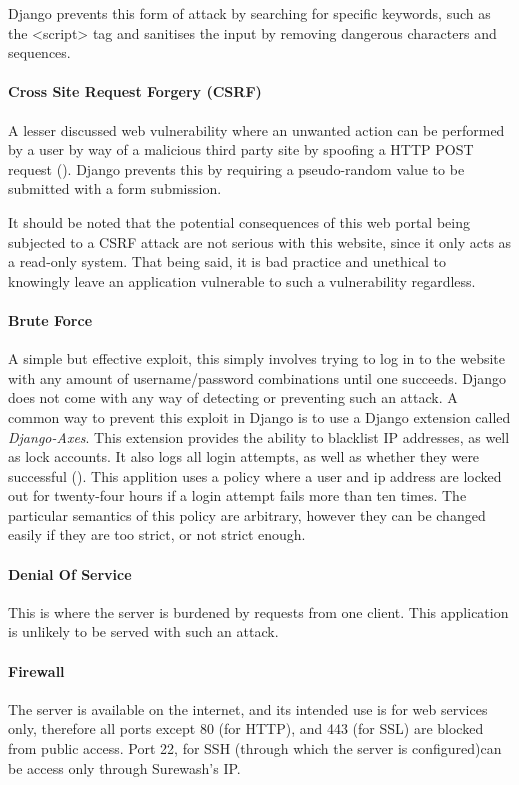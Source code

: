         Django prevents this form of attack by searching for specific keywords, such as the <script> tag and sanitises the input by removing dangerous characters and sequences.

        \paragraph{Cross Site Request Forgery (CSRF)}
        A lesser discussed web vulnerability where an unwanted action can be performed by a user by way of a malicious third party site by spoofing a HTTP POST request (\cite{zeller2008cross}). Django prevents this by requiring a pseudo-random value to be submitted with a form submission.

        It should be noted that the potential consequences of this web portal being subjected to a CSRF attack are not serious with this website, since it only acts as a read-only system. That being said, it is bad practice and unethical to knowingly leave an application vulnerable to such a vulnerability regardless.

        \paragraph{Brute Force}
        A simple but effective exploit, this simply involves trying to log in to the website with any amount of username/password combinations until one succeeds. Django does not come with any way of detecting or preventing such an attack. A common way to prevent this exploit in Django is to use a Django extension called {\slshape Django-Axes}. This extension provides the ability to blacklist IP addresses, as well as lock accounts. It also logs all login attempts, as well as whether they were successful (\cite{djangoaxes}). This applition uses a policy where a user and ip address are locked out for twenty-four hours if a login attempt fails more than ten times. The particular semantics of this policy are arbitrary, however they can be changed easily if they are too strict, or not strict enough.

        \paragraph{Denial Of Service}
        This is where the server is burdened by requests from one client. This application is unlikely to be served with such an attack.

        \paragraph{Firewall}
        The server is available on the internet, and its intended use is for web services only, therefore all ports except 80 (for HTTP), and 443 (for SSL) are blocked from public access. Port 22, for SSH (through which the server is configured)can be access only through Surewash's IP.
    
